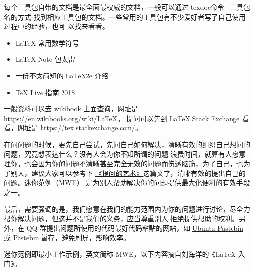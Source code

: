 








每个工具包自带的文档是最全面最权威的文档，一般可以通过 texdoc命令+工具包名的方式
找到相应工具包的文档。一些常用的工具包有不少爱好者写了自己使用过程中的经验，也可
以找来看看。



\begin{itemize}
\item \LaTeX{} 常用数学符号
\item \LaTeX{} Note 包太雷
\item 一份不太简短的 \LaTeX{2e} 介绍
\item \TeX{} Live 指南 2018
\end{itemize}



一般资料可以去 wikibook 上面查询，网址是
\url{https://en.wikibooks.org/wiki/LaTeX}。
提问可以先到 \LaTeX{} Stack Exchange 看看，网址是
\url{https://tex.stackexchange.com/}。



在问问题的时候，要先自己尝试，先问自己如何解决，清晰有效的组织自己想问的问题，究竟想表达什么？没有人会为你不知所谓的问题
浪费时间，就算有人愿意理你，也会因为你的问题不清晰甚至完全无效的问题而伤透脑筋，为了自己，也为了别人，建议大家可以参考下
\href{https://www.jianshu.com/p/f96aa7f7bf59}{《提问的艺术》}这篇文字，清晰有效的提出自己的问题。迷你范例（MWE）
是为别人帮助解决你的问题提供最大化便利的有效手段之一。

最后，需要强调的是，我们愿意在我们的能力范围内为你的问题进行讨论，尽全力帮你解决问题，但这并不是我们的义务，应当尊重别人
拒绝提供帮助的权利。另外，在 QQ 群提出问题所使用的代码最好代码粘贴的网站，如
\href{https://paste.ubuntu.com/}{Ubuntu Pastebin}
或
\href{https://pastebin.com/}{Pastebin}
暂存，避免刷屏，影响效率。


迷你范例即最小工作示例，英文简称 MWE，以下内容摘自刘海洋的《\LaTeX{} 入门》。

